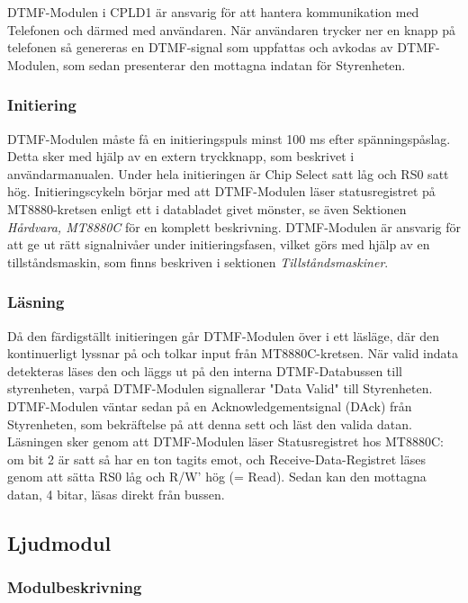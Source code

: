 \documentclass[a4paper,11pt]{article}
\begin{document}
	DTMF-Modulen i CPLD1 är ansvarig för att hantera kommunikation med Telefonen och därmed med användaren.
	När användaren trycker ner en knapp på telefonen så genereras en DTMF-signal som uppfattas och avkodas
	av DTMF-Modulen, som sedan presenterar den mottagna indatan för Styrenheten.
		
	\subsubsection{Initiering}

	DTMF-Modulen måste få en initieringspuls minst 100 ms efter spänningspåslag. Detta sker med hjälp av
	en extern tryckknapp, som beskrivet i användarmanualen. Under hela initieringen är Chip Select satt låg
	och RS0 satt hög. Initieringscykeln börjar med att DTMF-Modulen läser statusregistret på MT8880-kretsen enligt ett 		i databladet givet mönster, se även Sektionen {\it Hårdvara, MT8880C} för en komplett beskrivning.
	DTMF-Modulen är ansvarig för att ge ut rätt signalnivåer under initieringsfasen, vilket görs med hjälp av en
	tillståndsmaskin, som finns beskriven i sektionen {\it Tillståndsmaskiner}.
		
	\subsubsection{Läsning}

	Då den färdigställt initieringen går DTMF-Modulen över i ett läsläge, där den kontinuerligt lyssnar på och
	tolkar input från MT8880C-kretsen. När valid indata detekteras läses den och läggs ut på den interna
	DTMF-Databussen till styrenheten, varpå DTMF-Modulen signallerar "Data Valid" till Styrenheten. DTMF-Modulen
	väntar sedan på en Acknowledgementsignal (DAck) från Styrenheten, som bekräftelse på att denna sett och läst
	den valida datan. Läsningen sker genom att DTMF-Modulen läser Statusregistret hos MT8880C: om bit 2 är satt
	så har en ton tagits emot, och Receive-Data-Registret läses genom att sätta RS0 låg och R/W' hög (= Read).
	Sedan kan den mottagna datan, 4 bitar, läsas direkt från bussen.

	\subsection{Ljudmodul}

		\subsubsection{Modulbeskrivning}
\end{document}
